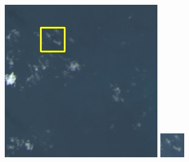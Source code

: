 \documentclass[UTF8]{ctexart}
\begin{document}
\begin{figure}[H]
{\begin{minipage}[b]{0.15\linewidth}
            \includegraphics[width=1\linewidth]{../log/spoon2/cut2/LC81620432014072LGN00_16329_color.jpg}\vspace{4pt}
            \includegraphics[width=1\linewidth]{../log/spoon2/cut2/tmp_cut_LC81620432014072LGN00_16329_color.jpg}\vspace{4pt}

\end{minipage}}
\end{figure}
\end{document}
